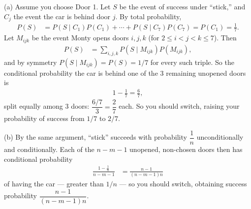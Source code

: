 \documentclass[11pt]{article}
\begin{document}
(a) Assume you choose Door 1. Let $S$ be the event of success under ``stick,'' and $C_j$ the event the car is behind door $j$. By total probability,
\begin{align*}
P(S) &= P(S\mid C_1)P(C_1)+\cdots+P(S\mid C_7)P(C_7) = P(C_1) = \frac17.
\end{align*}
Let $M_{ijk}$ be the event Monty opens doors $i,j,k$ (for $2\le i<j<k\le 7$). Then
\begin{align*}
P(S) &= \sum_{i,j,k} P(S\mid M_{ijk})P(M_{ijk}),
\end{align*}
and by symmetry $P(S\mid M_{ijk}) = P(S) = 1/7$ for every such triple. So the conditional probability the car is behind one of the 3 remaining unopened doors is
\begin{align*}
1-\frac17 = \frac67,
\end{align*}
split equally among 3 doors: $\dfrac{6/7}{3} = \dfrac27$ each. So you should switch, raising your probability of success from $1/7$ to $2/7$.

(b) By the same argument, ``stick'' succeeds with probability $\dfrac1n$ unconditionally and conditionally. Each of the $n-m-1$ unopened, non-chosen doors then has conditional probability
\begin{align*}
\frac{1-\tfrac1n}{n-m-1} &= \frac{n-1}{(n-m-1)n}
\end{align*}
of having the car — greater than $1/n$ — so you should switch, obtaining success probability $\dfrac{n-1}{(n-m-1)n}$.
\end{document}
